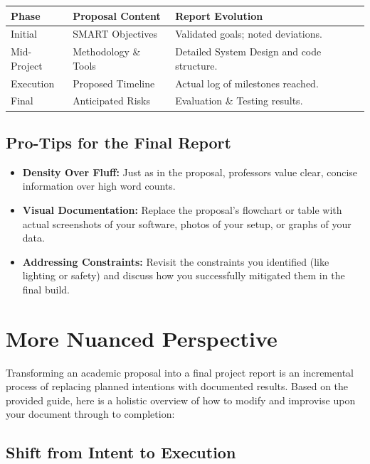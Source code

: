 \documentclass{report}
\begin{document}
\begin{center}
\begin{tabular}{|l|l|l|}
  \hline
  \textbf{Phase} & \textbf{Proposal Content} & \textbf{Report Evolution} \\
  \hline
  Initial & SMART Objectives & Validated goals; noted deviations. \\
  \hline
  Mid-Project & Methodology \& Tools & Detailed System Design and code structure. \\
  \hline
  Execution & Proposed Timeline & Actual log of milestones reached. \\
  \hline
  Final & Anticipated Risks & Evaluation \& Testing results. \\
  \hline
\end{tabular}
\end{center}

\subsection{Pro-Tips for the Final Report}

\begin{itemize}
  \item \textbf{Density Over Fluff:} Just as in the proposal, professors value
    clear, concise information over high word counts.
  \item \textbf{Visual Documentation:} Replace the proposal's flowchart or table
    with actual screenshots of your software, photos of your setup, or graphs
    of your data.
  \item \textbf{Addressing Constraints:} Revisit the constraints you identified
    (like lighting or safety) and discuss how you successfully mitigated them in
    the final build.
\end{itemize}

\section{More Nuanced Perspective}

Transforming an academic proposal into a final project report is an incremental
process of replacing planned intentions with documented results. Based on the
provided guide, here is a holistic overview of how to modify and improvise upon
your document through to completion:

\subsection{Shift from Intent to Execution}
\end{document}
